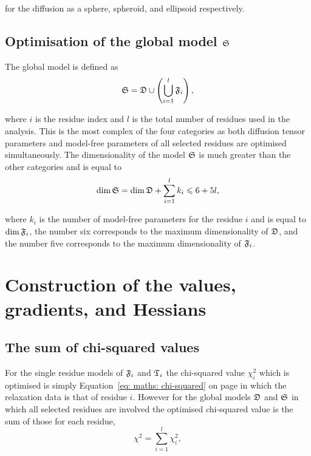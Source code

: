 \noindent for the diffusion as a sphere, spheroid, and ellipsoid respectively.




\subsection{Optimisation of the global model $\mathfrak{S}$}

The global model is defined as
\begin{equation}
    \mathfrak{S} = \mathfrak{D} \cup \left( \bigcup_{i=1}^l \mathfrak{F}_i \right),
\end{equation}

\noindent where $i$ is the residue index and $l$ is the total number of residues used in the analysis.  This is the most complex of the four categories as both diffusion tensor parameters and model-free parameters of all selected residues are optimised simultaneously.  The dimensionality of the model $\mathfrak{S}$ is much greater than the other categories and is equal to
\begin{equation}
    \dim \mathfrak{S} = \dim \mathfrak{D} + \sum_{i=1}^l k_i \leqslant 6 + 5l,
\end{equation}

\noindent where $k_i$ is the number of model-free parameters for the residue $i$ and is equal to $\dim \mathfrak{F}_i$, the number six corresponds to the maximum dimensionality of $\mathfrak{D}$, and the number five corresponds to the maximum dimensionality of $\mathfrak{F}_i$.





\section{Construction of the values, gradients, and Hessians}



\subsection{The sum of chi-squared values}

For the single residue models of $\mathfrak{F}_i$ and $\mathfrak{T}_i$ the chi-squared value $\chi^2_i$ which is optimised is simply Equation~\eqref{eq: maths: chi-squared} on page \pageref{eq: maths: chi-squared} in which the relaxation data is that of residue $i$.  However for the global models $\mathfrak{D}$ and $\mathfrak{S}$ in which all selected residues are involved the optimised chi-squared value is the sum of those for each residue,
\begin{equation}
    \chi^2 = \sum^l_{i=1} \chi^2_i,
\end{equation}

